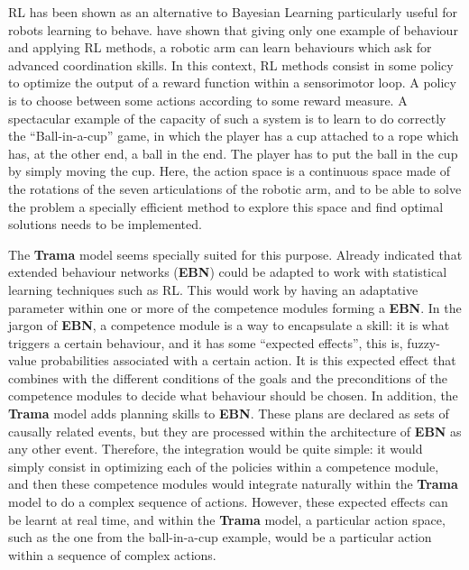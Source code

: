 \documentclass[
		twoside,openright,titlepage,numbers=noenddot,manychapters,
		headinclude,%
                footinclude=false,cleardoublepage=empty,
                BCOR=5mm,
		fontsize=11pt, %
                 enabledeprecatedfontcommands]{scrreprt}
\begin{document}
RL has been shown as an alternative to Bayesian Learning particularly useful for robots learning to behave. \cite{kober2009policy} have shown that giving only one example of behaviour and applying RL methods, a robotic arm can learn behaviours which ask for advanced coordination skills. In this context, RL methods consist in some policy to optimize the output of a reward function within a sensorimotor loop. A policy is to choose between some actions according to some reward measure. 
A spectacular example of the capacity of such a system is to learn to do correctly the ``Ball-in-a-cup'' game, in which the player has a cup attached to a rope which has, at the other end, a ball in the end. The player has to put the ball in the cup by simply moving the cup. Here, the action space is a continuous space made of the rotations of the seven articulations of the robotic arm, and to be able to solve the problem a specially efficient method to explore this space and find optimal solutions needs to be implemented.


The \textbf{Trama} model seems specially suited for this purpose. Already \cite{dorer2004ebn} indicated that extended behaviour networks (\textbf{EBN}) could be adapted to work with statistical learning techniques such as RL. This would work by having  an adaptative parameter within one or more of the competence modules forming a \textbf{EBN}.
In the jargon of \textbf{EBN}, a competence module is a way to encapsulate a skill: it is what triggers a certain behaviour, and it has some ``expected effects'', this is, fuzzy-value probabilities associated with a certain action. It is this expected effect that combines with the different conditions of the goals and the preconditions of the competence modules to decide what behaviour should be chosen. 
In addition, the \textbf{Trama} model adds planning skills to \textbf{EBN}. These plans are declared as sets of causally related events, but they are processed within the architecture of \textbf{EBN} as any other event. Therefore, the integration would be quite simple: it would simply consist in optimizing each of the policies within a competence module, and then these competence modules would integrate naturally within the \textbf{Trama} model to do a complex sequence of actions. However, these expected effects can be learnt at real time, and within the \textbf{Trama} model, a particular action space, such as the one from  the ball-in-a-cup example, would be a particular action within a sequence of complex actions. 
\end{document}
